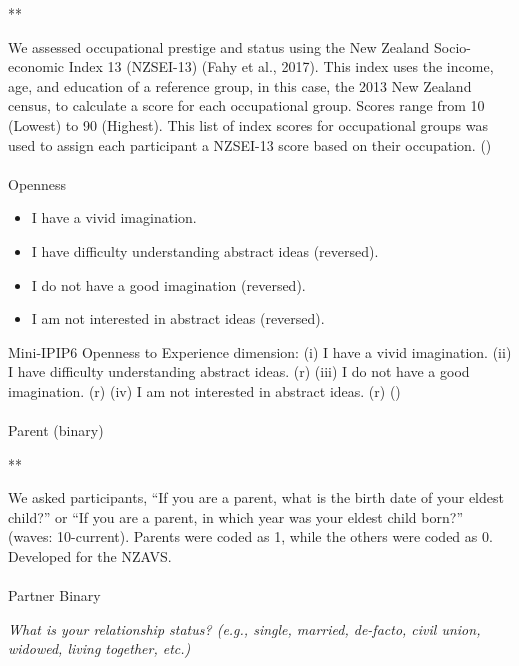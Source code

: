 \documentclass[
  single column]{article}
\makeatletter
\let\oldparagraph\paragraph
\renewcommand{\paragraph}{
    \@ifstar
      \xxxParagraphStar
      \xxxParagraphNoStar
  }
\newcommand{\xxxParagraphStar}[1]{\oldparagraph*{#1}\mbox{}}
\newcommand{\xxxParagraphNoStar}[1]{\oldparagraph{#1}\mbox{}}
\providecommand{\tightlist}{%
  \setlength{\itemsep}{0pt}\setlength{\parskip}{0pt}}\usepackage{longtable,booktabs,array}
\makeatother
\begin{document}
**

We assessed occupational prestige and status using the New Zealand
Socio-economic Index 13 (NZSEI-13) (Fahy et al., 2017). This index uses
the income, age, and education of a reference group, in this case, the
2013 New Zealand census, to calculate a score for each occupational
group. Scores range from 10 (Lowest) to 90 (Highest). This list of index
scores for occupational groups was used to assign each participant a
NZSEI-13 score based on their occupation. ()

\paragraph{Openness}\label{openness}

\begin{itemize}
\tightlist
\item
  I have a vivid imagination.
\item
  I have difficulty understanding abstract ideas (reversed).
\item
  I do not have a good imagination (reversed).
\item
  I am not interested in abstract ideas (reversed).
\end{itemize}

Mini-IPIP6 Openness to Experience dimension: (i) I have a vivid
imagination. (ii) I have difficulty understanding abstract ideas. (r)
(iii) I do not have a good imagination. (r) (iv) I am not interested in
abstract ideas. (r) ()

\paragraph{Parent (binary)}\label{parent-binary}

**

We asked participants, ``If you are a parent, what is the birth date of
your eldest child?'' or ``If you are a parent, in which year was your
eldest child born?'' (waves: 10-current). Parents were coded as 1, while
the others were coded as 0. Developed for the NZAVS.

\paragraph{Partner Binary}\label{partner-binary}

\emph{What is your relationship status? (e.g., single, married,
de-facto, civil union, widowed, living together, etc.)}
\end{document}
